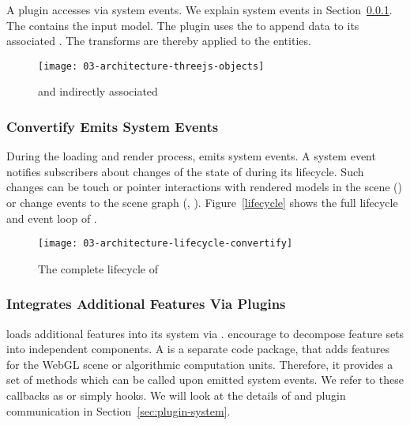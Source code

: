 \documentclass[../03-Architecture.tex]{subfiles}
\begin{document}
A plugin accesses  via system events. We explain system
events in Section~\ref{convertify-emits-events}. The 
contains the input model. The plugin uses the  to append
data to its associated . The 
transforms are thereby applied to the {\threejs} entities.


\begin{figure}[h]
  \centering
  \texttt{[image: 03-architecture-threejs-objects]}
  \caption{ and indirectly associated }
  \label{fig:nodes-and-three}
\end{figure}

\subsubsection{Convertify Emits System Events}
\label{convertify-emits-events}

During the loading and render process, {\convertify} emits
system events. A system event notifies subscribers about
changes of the state of {\convertify} during its lifecycle.
Such changes can be touch or pointer interactions with
rendered models in the scene () or
change events to the scene graph (,
). Figure~\ref{lifecycle} shows the full
lifecycle and event loop of {\convertify}.

\begin{figure}[h]
  \centering
  \texttt{[image: 03-architecture-lifecycle-convertify]}
  \caption{The complete lifecycle of {\convertify}}
  \label{fig:lifecycle}
\end{figure}

\subsubsection{{\convertify} Integrates Additional Features
  Via Plugins}

{\convertify} loads additional features into its system via
.  encourage to decompose
feature sets into independent components. A 
is a separate code package, that adds features for the WebGL
scene or algorithmic computation units. Therefore, it
provides a set of methods which can be called upon emitted
system events. We refer to these callbacks as
 or simply hooks. We will look at the
details of  and plugin communication in
Section~\ref{sec:plugin-system}.
\end{document}
